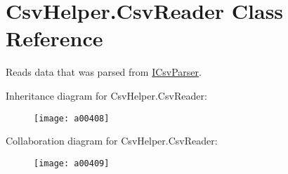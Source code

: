 \hypertarget{a00074}{\section{Csv\-Helper.\-Csv\-Reader Class Reference}
\label{a00074}
}


Reads data that was parsed from \hyperlink{a00108}{I\-Csv\-Parser}.  




Inheritance diagram for Csv\-Helper.\-Csv\-Reader\-:
\nopagebreak
\begin{figure}[H]
\begin{center}
\leavevmode
\texttt{[image: a00408]}
\end{center}
\end{figure}


Collaboration diagram for Csv\-Helper.\-Csv\-Reader\-:
\nopagebreak
\begin{figure}[H]
\begin{center}
\leavevmode
\texttt{[image: a00409]}
\end{center}
\end{figure}
